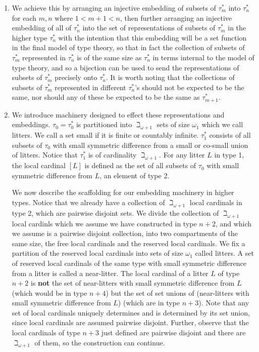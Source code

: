 \documentclass[12pt]{article}
\begin{document}
\begin{enumerate}
\item We achieve this by arranging an injective embedding of subsets of $\tau^*_m$ into $\tau^*_n$ for each $m,n$ where $1<m+1<n$, then further arranging an injective embedding of all of $\tau^*_n$ into
the set of representations of subsets of $\tau^*_m$ in the higher type $\tau^*_n$ with the intention that this embedding will be a set function in the final model of type theory, so that
in fact the collection of subsets of $\tau^*_m$ represented in $\tau^*_n$ is of the same size as $\tau^*_n$ in terms internal to the model of type theory, and so a bijection can be used to send the representations of subsets of
$\tau^*_m$  precisely onto $\tau^*_n$.  It is worth noting that the collections of subsets of $\tau^*_m$ represented in different $\tau^*_n$'s should not be expected to be the same, nor should any of these be expected to be the same as $\tau^*_{m+1}$.

\item We introduce machinery designed to effect these representations and embeddings.  $\tau_0=\tau^*_0$ is partitioned into $\beth_{\omega+1}$ sets of size $\omega_1$ which we call litters.
We call a set small if it is finite or countably infinite.  $\tau^*_1$ consists of all subsets of $\tau_0$ with small symmetric difference from a small or co-small union of litters.  Notice that $\tau^*_1$ is of cardinality $\beth_{\omega+1}$. For any litter $L$ in type 1,
the local cardinal $[L]$ is defined as the set of all subsets of $\tau_0$ with small symmetric difference from $L$, an element of type 2.

We now describe the scaffolding for our embedding machinery in higher types.  Notice that we already have a collection of $\beth_{\omega+1}$ local cardinals in type 2, which are pairwise disjoint sets.
We divide the collection of $\beth_{\omega+1}$ local cardinls which we assume we have constructed in type $n+2$, and which we assume is a pairwise disjoint collection,  into two compartments of the same size, the free local cardinals and the reserved local cardinals.
We fix a partition of the reserved  local cardinals into sets of size $\omega_1$ called litters.  A set of reserved local cardinals of the same type 
with small symmetric difference from a litter is called a near-litter.  The local cardinal of a litter $L$ of type $n+2$ is {\bf not} the set of near-litters with small symmetric difference from $L$
(which would be in type $n+4$) but the set of set unions of (near-litters with small symmetric difference from $L$) (which are in type $n+3$).  Note that any set of local cardinals uniquely determines and is determined by its set union, since local cardinals are assumed pairwise disjoint.  Further, observe that the local cardinals of type $n+3$ just defined are pairwise disjoint and there are $\beth_{\omega+1}$ of them, so the construction can continue.


\end{enumerate}
\end{document}
